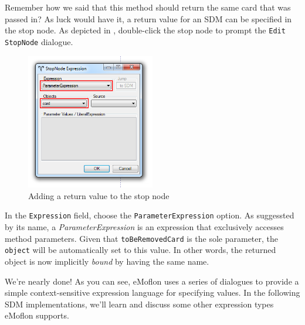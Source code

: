 \begin{stepbystep}
\vspace{0.5cm}

\item Remember how we said that this method should return the same card that was passed in? As luck would have it, a return value for an
SDM can be specified in the stop node. As depicted in , double-click the stop node to prompt the \texttt{Edit StopNode}
dialogue.

\newpage

\begin{figure}[htbp]
\begin{center}
  \includegraphics[width=0.5\textwidth]{../../org.moflon.doc.handbook.03_storyDiagrams/03_removeCard/visRemImages/ea_sdmStopNodeExpr}
  \caption{Adding a return value to the stop node}  
  \label{ea:stop_node_return_value}
\end{center}
\end{figure}

\item In the \texttt{Expression} field, choose the \texttt{ParameterExpression} option.
As suggessted by its name, a \emph{ParameterExpression} is an expression that exclusively accesses method parameters. Given that \texttt{toBeRemovedCard} is the sole
parameter, the \texttt{object} will be automatically set to this value. In other words, the returned object is now implicitly \emph{bound} by having the same
name.

\vspace{0.5cm}

We're nearly done! As you can see, eMoflon uses a series of dialogues to provide a simple context-sensitive expression language for specifying  values. In the
following SDM implementations, we'll learn and discuss some other expression types eMoflon supports.


\end{stepbystep}
